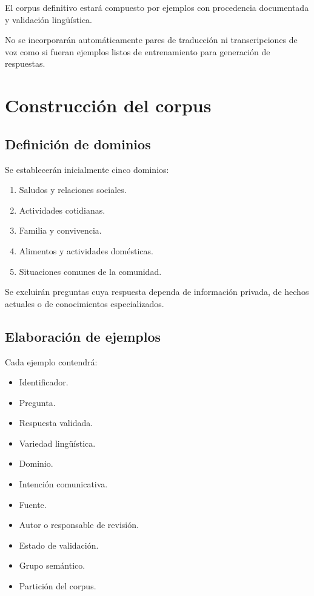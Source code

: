 El corpus definitivo estará compuesto por ejemplos con procedencia documentada y validación lingüística.

No se incorporarán automáticamente pares de traducción ni transcripciones de voz como si fueran ejemplos listos de entrenamiento para generación de respuestas.

\section{Construcción del corpus}\label{construcciuxf3n-del-corpus}

\subsection{Definición de dominios}\label{definiciuxf3n-de-dominios}

Se establecerán inicialmente cinco dominios:

\begin{enumerate}
\def\labelenumi{\arabic{enumi}.}
\tightlist
\item
  Saludos y relaciones sociales.
\item
  Actividades cotidianas.
\item
  Familia y convivencia.
\item
  Alimentos y actividades domésticas.
\item
  Situaciones comunes de la comunidad.
\end{enumerate}

Se excluirán preguntas cuya respuesta dependa de información privada, de hechos actuales o de conocimientos especializados.

\subsection{Elaboración de ejemplos}\label{elaboraciuxf3n-de-ejemplos}

Cada ejemplo contendrá:

\begin{itemize}
\tightlist
\item
  Identificador.
\item
  Pregunta.
\item
  Respuesta validada.
\item
  Variedad lingüística.
\item
  Dominio.
\item
  Intención comunicativa.
\item
  Fuente.
\item
  Autor o responsable de revisión.
\item
  Estado de validación.
\item
  Grupo semántico.
\item
  Partición del corpus.
\end{itemize}

